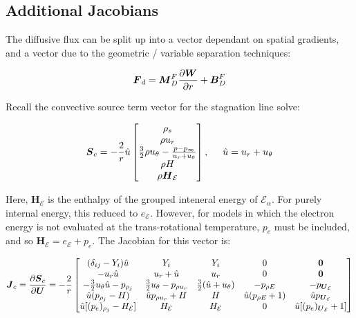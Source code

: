 \documentclass[10pt]{article}
\begin{document}
\begin{flushleft}
\subsection{Additional Jacobians}

The diffusive flux can be split up into a vector dependant on spatial gradients, and a vector due to the geometric / variable separation techniques:

\begin{equation*}
    \boldsymbol{F}_d = \boldsymbol{M}_D^F \frac{\partial \boldsymbol{W}}{\partial r} + \boldsymbol{B}_D^F
\end{equation*}



Recall the convective source term vector for the stagnation line solve:

\begin{equation}
    \boldsymbol{S}_c = -\frac{2}{r} \hat{u} \begin{bmatrix}
        \rho_s \\ \rho u_r \\ \frac{3}{2} \rho u_\theta - \frac{p - p_\infty}{u_r + u_\theta} \\ \rho H \\ \rho \boldsymbol{H}_{\mathcal{E}} 
    \end{bmatrix}, \hspace{5mm} \hat{u} = u_r + u_\theta
\end{equation}

Here, $\boldsymbol{H}_{\mathcal{E}} $ is the enthalpy of the grouped inteneral energy of $\mathcal{E}_\alpha$. For purely internal energy, this reduced to $e_\mathcal{E}$. However, for models in which the electron energy is not evaluated at the trans-rotational temperature, $p_e$ must be included, and so $\boldsymbol{H}_\mathcal{E} = e_\mathcal{E} + p_e$. The Jacobian for this vector is:

\begin{equation}
    \boldsymbol{J}_c = \frac{\partial \boldsymbol{S}_c}{\partial \boldsymbol{U}} = -\frac{2}{r} \begin{bmatrix}
        (\delta_{ij} - Y_i) \hat{u} & Y_i & Y_i & 0 & \boldsymbol{0} \\
        -u_r \hat{u} & u_r + \hat{u} & u_r & 0 & \boldsymbol{0} \\
        -\frac{3}{2} u_\theta \hat{u} - p_{\rho_j} & \frac{3}{2} u_\theta - p_{\rho u_r} & \frac{3}{2} (\hat{u} + u_\theta) & - p_{\rho E} & -p_{\boldsymbol{U}_{\mathcal{E}}} \\
        \hat{u} (p_{\rho_j} - H) & \hat{u} p_{\rho u_r} + H & H & \hat{u} (p_{\rho E} + 1) & \hat{u} p_{\boldsymbol{U}_{\mathcal{E}}} \\
        \hat{u} [(p_e)_{\rho_j} - H_\mathcal{E}] & H_\mathcal{E} & H_\mathcal{E} & 0 & \hat{u} [(p_e)_{\boldsymbol{U}_{\mathcal{E}}} + 1] \\
    \end{bmatrix}
\end{equation}





\newpage


\end{flushleft}
\end{document}

